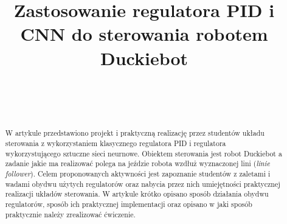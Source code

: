 \documentclass[conference]{IEEEtran}
\begin{document}
%
\title{Zastosowanie regulatora PID i CNN do sterowania robotem Duckiebot}


\author{
\\[0.4cm]
\and
{}
\\
}


\maketitle              %

\begin{abstract}
W artykule przedstawiono projekt i praktyczną realizację przez studentów układu sterowania
z wykorzystaniem klasycznego regulatora PID i regulatora wykorzystującego sztuczne sieci neurnowe.
Obiektem sterowania jest robot Duckiebot a zadanie jakie ma realizować polega na jeździe robota wzdłuż wyznaczonej lini (\emph{linie follower}). Celem proponowanych aktywności jest zapoznanie studentów z zaletami  i wadami obydwu użytych regulatorów oraz nabycia przez nich umiejętności praktycznej realizacji układów sterowania. 
W artykule krótko opisano sposób działania obydwu regulatorów, sposób ich praktycznej implementacji oraz opisano w jaki sposób praktycznie należy zrealizować ćwiczenie. 
\end{abstract}
\end{document}
